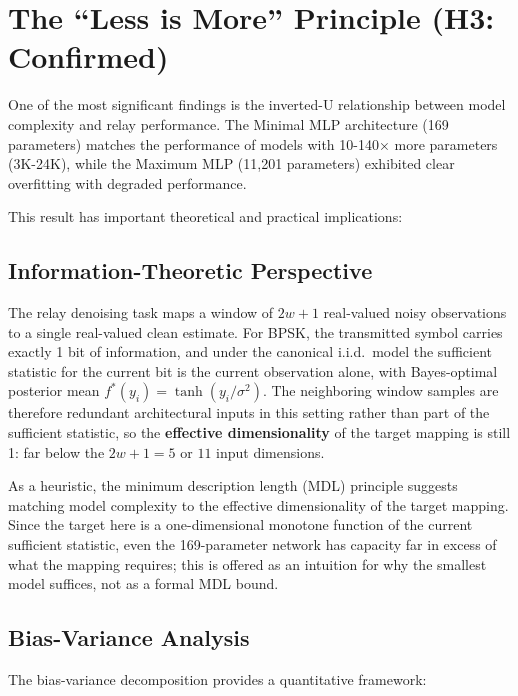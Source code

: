 \section{The ``Less is More'' Principle (H3: Confirmed)}\label{sec:the-less-is-more-principle-h3-confirmed}

One of the most significant findings is the inverted-U relationship between model complexity and relay performance. The Minimal MLP architecture (169 parameters) matches the performance of models with 10-140× more parameters (3K-24K), while the Maximum MLP (11,201 parameters) exhibited clear overfitting with degraded performance.

This result has important theoretical and practical implications:

\subsection{Information-Theoretic Perspective}\label{sec:information-theoretic-perspective}

The relay denoising task maps a window of \(2w+1\) real-valued noisy observations to a single real-valued clean estimate. For BPSK, the transmitted symbol carries exactly 1 bit of information, and under the canonical i.i.d.\ model the sufficient statistic for the current bit is the current observation alone, with Bayes-optimal posterior mean \(f^*(y_i) = \tanh(y_i / \sigma^2)\). The neighboring window samples are therefore redundant architectural inputs in this setting rather than part of the sufficient statistic, so the \textbf{effective dimensionality} of the target mapping is still 1: far below the \(2w+1 = 5\) or \(11\) input dimensions.

As a heuristic, the minimum description length (MDL) principle suggests matching model complexity to the effective dimensionality of the target mapping. Since the target here is a one-dimensional monotone function of the current sufficient statistic, even the 169-parameter network has capacity far in excess of what the mapping requires; this is offered as an intuition for why the smallest model suffices, not as a formal MDL bound.

\subsection{Bias-Variance Analysis}\label{sec:bias-variance-analysis}

The bias-variance decomposition \cite{GoodfellowBengioCourville2016DeepLearning} provides a quantitative framework:

